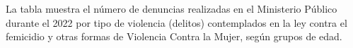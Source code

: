 La tabla muestra el número de denuncias realizadas en el Ministerio Público durante el 2022 por tipo de violencia (delitos) contemplados en la ley contra el femicidio y otras formas de Violencia Contra la Mujer, según grupos de edad.